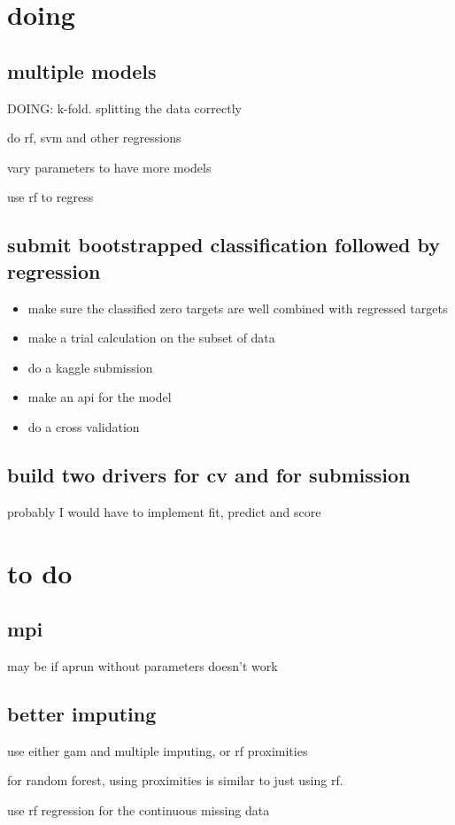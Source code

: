 \documentclass{article}
\let\Item\item
\renewcommand\item{\normalcolor\Item}
\newcommand\done{\color[RGB]{129, 180, 185} \ding{52} }
\begin{document}
\section{doing}
\subsection{multiple models}
DOING: k-fold. splitting the data correctly

do rf, svm and other regressions

vary parameters to have more models

use rf to regress
\subsection{submit bootstrapped classification followed by regression}


\begin{itemize}
  \item \done make sure the classified zero targets are well combined with regressed targets
  \item \done make a trial calculation on the subset of data
  \item do a kaggle submission
  \item make an api for the model
  \item do a cross validation
\end{itemize}


\subsection{build two drivers for cv and for submission}
probably I would have to implement fit, predict and score
\section{to do}
\subsection{mpi}
may be if aprun without parameters doesn't work
\subsection{better imputing}
use either gam and multiple imputing, or rf proximities

for random forest, using proximities is similar to just using rf.

use rf regression for the continuous missing data 
\end{document}
